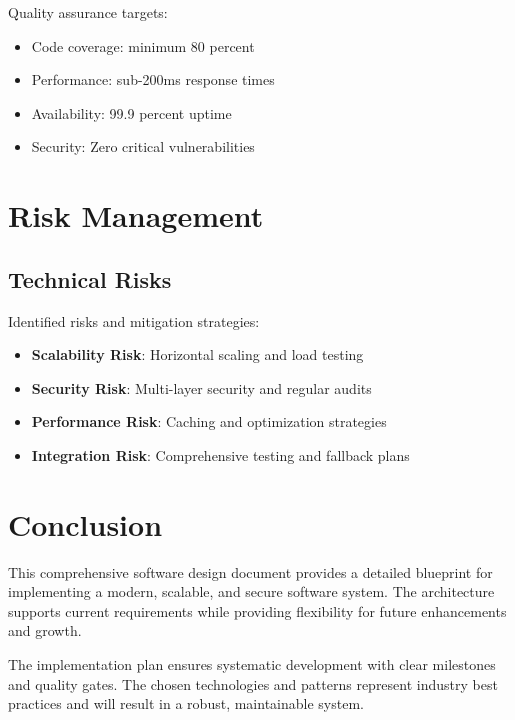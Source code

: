 \documentclass[11pt,a4paper,oneside]{article}
\begin{document}
Quality assurance targets:

\begin{itemize}
\item Code coverage: minimum 80 percent
\item Performance: sub-200ms response times
\item Availability: 99.9 percent uptime
\item Security: Zero critical vulnerabilities
\end{itemize}

\section{Risk Management}

\subsection{Technical Risks}

Identified risks and mitigation strategies:

\begin{itemize}
\item \textbf{Scalability Risk}: Horizontal scaling and load testing
\item \textbf{Security Risk}: Multi-layer security and regular audits
\item \textbf{Performance Risk}: Caching and optimization strategies
\item \textbf{Integration Risk}: Comprehensive testing and fallback plans
\end{itemize}

\section{Conclusion}

This comprehensive software design document provides a detailed blueprint for implementing a modern, scalable, and secure software system. The architecture supports current requirements while providing flexibility for future enhancements and growth.

The implementation plan ensures systematic development with clear milestones and quality gates. The chosen technologies and patterns represent industry best practices and will result in a robust, maintainable system.
\end{document}
